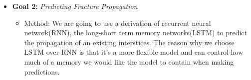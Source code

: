 \begin{itemize}
\item \textbf{Goal 2:} \emph{Predicting Fracture Propagation} 
\begin{itemize} 
    \item Method: We are going to use a derivation of recurrent neural network(RNN), the long-short term memory networks(LSTM) to predict the propagation of an existing interstices. The reason why we choose LSTM over RNN is that it's a more flexible model and can control how much of a memory we would like the model to contain when making predictions.
    
    
    
    
    
\end{itemize}



\end{itemize}
